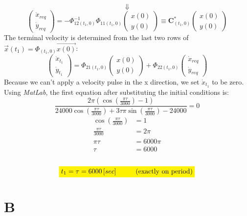 \documentclass[11pt, a4paper]{article}
\begin{document}
\begin{equation*}
    \Downarrow
\end{equation*}
\begin{equation}
    \begin{pmatrix}
        \dot{x}_{req} \\
        \dot{y}_{req}
    \end{pmatrix} = -\Phi_{12(t_1,0)}^{-1}\Phi_{11(t_1,0)}\begin{pmatrix}
        x(0)\\y(0)
    \end{pmatrix} \equiv \mathbf{C}^*_{(t_1,0)} \begin{pmatrix}
        x(0)\\y(0)
    \end{pmatrix}
\end{equation}
The terminal velocity is determined from the last two rows of $\vec{x}(t_1)=\Phi_(t_1,0)\vec{x(0)}$:
\begin{equation}
    \begin{pmatrix}
        \dot{x}_{t_1}\\\dot{y}_{t_1}
    \end{pmatrix} = \Phi_{21(t_1,0)}\begin{pmatrix}
        x(0)\\y(0)
    \end{pmatrix} + \Phi_{22(t_1,0)}\begin{pmatrix}
        \dot{x}_{req} \\
        \dot{y}_{req}
    \end{pmatrix}
\end{equation}
Because we can't apply a velocity pulse in the x direction, we set $\dot{x}_{t_1}$ to be zero. Using \emph{MatLab}, the first equation after substituting the initial conditions is:
\begin{equation}
    \frac{\displaystyle2\pi\left(\cos\left(\frac{\pi\tau}{3000}\right)-1\right)}{\displaystyle24000\cos\left(\frac{\pi\tau}{3000}\right)+3\tau\pi\sin\left(\frac{\pi\tau}{3000}\right)-24000} = 0
\end{equation}
\begin{align}
    \cos\left(\frac{\pi\tau}{3000}\right) &= 1 \\
    \frac{\pi\tau}{3000} &= 2\pi \\
    \pi\tau &= 6000\pi \\
    \tau &= 6000
\end{align}
\\
$$\colorbox{yellow}{$t_1 = \tau = 6000\left[sec\right]$\hspace{1cm}(exactly on period)}$$

\section{B}
\end{document}
